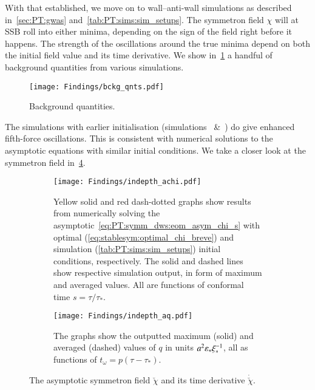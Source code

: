 With that established, we move on to wall--anti-wall simulations as described in~\cref{sec:PT:gwas} and~\cref{tab:PT:sims:sim_setups}. %
The symmetron field $\chi$ will at SSB roll into either minima, depending on the sign of the field right before it happens. The strength of the oscillations around the true minima depend on both the initial field value and its time derivative. %
We show in~\cref{fig:results:achi:bckg_qnts} a handful of background quantities from various simulations. %
\begin{figure}[h]
    \centering
    \texttt{[image: Findings/bckg\_qnts.pdf]}
    \caption{Background quantities. }
    \label{fig:results:achi:bckg_qnts}
\end{figure}
The simulations with earlier initialisation (simulations~ \&~) do give enhanced fifth-force oscillations. This is consistent with numerical solutions to the asymptotic equations with similar initial conditions. We take a closer look at the symmetron field in~\cref{fig:results:achi:indepth_achi_aq}. %


\begin{figure}[ht]
    \centering
    \begin{subfigure}[b]{\linewidth}
        \centering
        \texttt{[image: Findings/indepth\_achi.pdf]}
        \caption{Yellow solid and red dash-dotted graphs show results from numerically solving the asymptotic~\cref{eq:PT:symm_dws:eom_asym_chi_s} with optimal (\cref{eq:stablesym:optimal_chi_breve}) and simulation (\cref{tab:PT:sims:sim_setups}) initial conditions, respectively. The solid and dashed lines show respective simulation output, in form of maximum and averaged values. All are functions of conformal time $s=\tau/\tau_\ast$.}
        \label{fig:results:achi:indepth_achi}
    \end{subfigure}
    \hfill
    \begin{subfigure}[b]{\linewidth}
        \centering
        \texttt{[image: Findings/indepth\_aq.pdf]}
        \caption{The graphs show the outputted maximum (solid) and averaged (dashed) values of $q$ in units $a^2 \varepsilon_\ast \xi_\ast^{-1}$, all as functions of $t_\omega = p(\tau-\tau_\ast)$.}
        \label{fig:results:achi:indepth_aq}
    \end{subfigure}
    \caption{The asymptotic symmetron field $\breve{\chi}$ and its time derivative $\dot{\breve{\chi}}$.}
    \label{fig:results:achi:indepth_achi_aq}
\end{figure}

